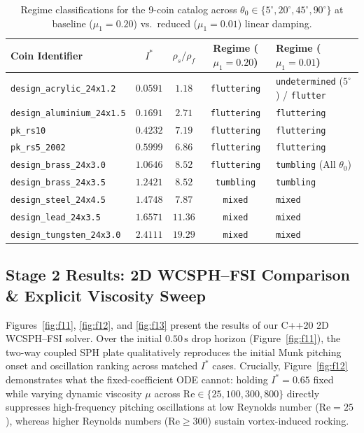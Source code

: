 \documentclass[10pt,a4paper,twocolumn]{article}
\begin{document}
\begin{table}[t]
\centering
\caption{Regime classifications for the 9-coin catalog across $\theta_0 \in \{5^\circ, 20^\circ, 45^\circ, 90^\circ\}$ at baseline ($\mu_1 = 0.20$) vs.\ reduced ($\mu_1 = 0.01$) linear damping.}
\label{tab:coins}
\footnotesize
\begin{tabular}{lcccl}
\toprule
\textbf{Coin Identifier} & $I^*$ & $\rho_s/\rho_f$ & \textbf{Regime ($\mu_1=0.20$)} & \textbf{Regime ($\mu_1=0.01$)} \\
\midrule
\texttt{design\_acrylic\_24x1.2}   & $0.0591$ & $1.18$  & \texttt{fluttering} & \texttt{undetermined} ($5^\circ$) / \texttt{flutter} \\
\texttt{design\_aluminium\_24x1.5} & $0.1691$ & $2.71$  & \texttt{fluttering} & \texttt{fluttering} \\
\texttt{pk\_rs10}                  & $0.4232$ & $7.19$  & \texttt{fluttering} & \texttt{fluttering} \\
\texttt{pk\_rs5\_2002}             & $0.5999$ & $6.86$  & \texttt{fluttering} & \texttt{fluttering} \\
\texttt{design\_brass\_24x3.0}     & $1.0646$ & $8.52$  & \texttt{fluttering} & \texttt{tumbling} (All $\theta_0$) \\
\texttt{design\_brass\_24x3.5}     & $1.2421$ & $8.52$  & \texttt{tumbling}   & \texttt{tumbling} \\
\texttt{design\_steel\_24x4.5}     & $1.4748$ & $7.87$  & \texttt{mixed}      & \texttt{mixed} \\
\texttt{design\_lead\_24x3.5}      & $1.6571$ & $11.36$ & \texttt{mixed}      & \texttt{mixed} \\
\texttt{design\_tungsten\_24x3.0}  & $2.4111$ & $19.29$ & \texttt{mixed}      & \texttt{mixed} \\
\bottomrule
\end{tabular}
\end{table}

\subsection{Stage 2 Results: 2D WCSPH--FSI Comparison \& Explicit Viscosity Sweep}
Figures~\ref{fig:f11}, \ref{fig:f12}, and \ref{fig:f13} present the results of our C++20 2D WCSPH--FSI solver. Over the initial $0.50\,\mathrm{s}$ drop horizon (Figure~\ref{fig:f11}), the two-way coupled SPH plate qualitatively reproduces the initial Munk pitching onset and oscillation ranking across matched $I^*$ cases. Crucially, Figure~\ref{fig:f12} demonstrates what the fixed-coefficient ODE cannot: holding $I^* = 0.65$ fixed while varying dynamic viscosity $\mu$ across $\mathrm{Re} \in \{25, 100, 300, 800\}$ directly suppresses high-frequency pitching oscillations at low Reynolds number ($\mathrm{Re} = 25$), whereas higher Reynolds numbers ($\mathrm{Re} \ge 300$) sustain vortex-induced rocking.
\end{document}
